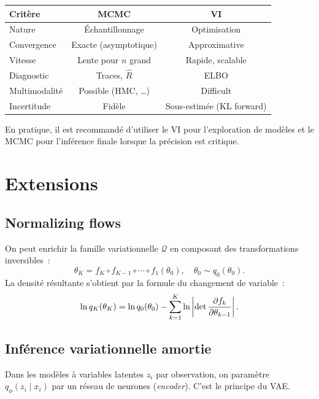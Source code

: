 \begin{center}
\begin{tabular}{lcc}
\hline
\textbf{Crit\`ere} & \textbf{MCMC} & \textbf{VI} \\
\hline
Nature & \'Echantillonnage & Optimisation \\
Convergence & Exacte (asymptotique) & Approximative \\
Vitesse & Lente pour $n$ grand & Rapide, scalable \\
Diagnostic & Traces, $\hat{R}$ & ELBO \\
Multimodalit\'e & Possible (HMC, \ldots) & Difficult \\
Incertitude & Fid\`ele & Sous-estim\'ee (KL forward) \\
\hline
\end{tabular}
\end{center}

\begin{remarque}
En pratique, il est recommand\'e d'utiliser le VI pour l'exploration
de mod\`eles et le MCMC pour l'inf\'erence finale lorsque la pr\'ecision
est critique.
\end{remarque}

\section{Extensions}

\subsection{Normalizing flows}

On peut enrichir la famille variationnelle $\mathcal{Q}$ en composant
des transformations inversibles~:
\[
  \theta_K = f_K \circ f_{K-1} \circ \cdots \circ f_1(\theta_0),
  \quad \theta_0 \sim q_0(\theta_0).
\]
La densit\'e r\'esultante s'obtient par la formule du changement de variable~:
\[
  \ln q_K(\theta_K) = \ln q_0(\theta_0)
  - \sum_{k=1}^K \ln \left| \det \frac{\partial f_k}{\partial \theta_{k-1}} \right|.
\]

\subsection{Inf\'erence variationnelle amortie}

Dans les mod\`eles \`a variables latentes $z_i$ par observation, on
param\`etre $q_\phi(z_i \mid x_i)$ par un r\'eseau de neurones
(\emph{encoder}). C'est le principe du VAE.

